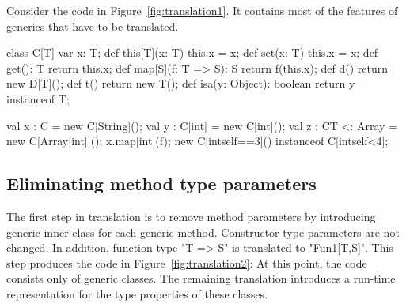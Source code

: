 \documentclass{llncs}
\begin{document}
Consider the code in Figure~\ref{fig:translation1}.  It contains most of the 
features of generics that have to be translated.
\begin{figure*}[tp]
\begin{xten}
class C[T] {
    var x: T;
    def this[T](x: T) { this.x = x; }
    def set(x: T) { this.x = x; }
    def get(): T { return this.x; }
    def map[S](f: T => S): S { return f(this.x); }
    def d() { return new D[T](); }
    def t() { return new T(); }
    def isa(y: Object): boolean { return y instanceof T; }
}

val x : C = new C[String]();
val y : C[int] = new C[int]();
val z : C{T <: Array} = new C[Array[int]]();
x.map[int](f);
new C[int{self==3}]() instanceof C[int{self<4}];
\end{xten}
\caption{Code to translate}
\label{fig:translation1}
\end{figure*}

\subsection{Eliminating method type parameters}

\begin{figure*}[tp]
\caption{After removing method parameters}
\label{fig:translation2}
\end{figure*}

The first step in translation is to remove method parameters by
introducing generic inner class for each generic method.
Constructor type parameters are not changed.
In addition, function type \xcd"T => S" is translated to \xcd"Fun1[T,S]".
This step produces the code in Figure~\ref{fig:translation2}:
At this point, the code consists only of generic classes.
The remaining translation introduces a run-time representation
for the type properties of these classes.
\end{document}
